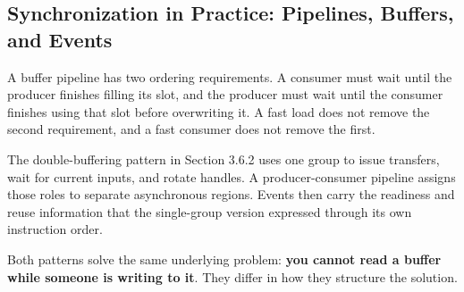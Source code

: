 \subsection*{Synchronization in Practice: Pipelines, Buffers, and Events}

A buffer pipeline has two ordering requirements. A consumer must wait until the producer finishes filling its slot, and the producer must wait until the consumer finishes using that slot before overwriting it. A fast load does not remove the second requirement, and a fast consumer does not remove the first.

The double-buffering pattern in Section 3.6.2 uses one group to issue transfers, wait for current inputs, and rotate handles. A producer-consumer pipeline assigns those roles to separate asynchronous regions. Events then carry the readiness and reuse information that the single-group version expressed through its own instruction order.

Both patterns solve the same underlying problem: \textbf{you cannot read a buffer while someone is writing to it}. They differ in how they structure the solution.
